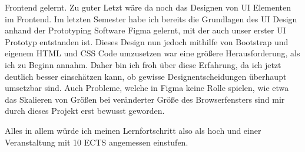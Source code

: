 Frontend gelernt. Zu guter Letzt wäre da noch das Designen von \ac{UI} Elementen im
Frontend. Im letzten Semester habe ich bereits die Grundlagen des UI Design anhand der
Prototyping Software Figma gelernt, mit der auch unser erster \ac{UI} Prototyp entstanden
ist. Dieses Design nun jedoch mithilfe von Bootstrap und eigenem HTML und CSS Code
umzusetzen war eine größere Herausforderung, als ich zu Beginn annahm. Daher bin ich froh
über diese Erfahrung, da ich jetzt deutlich besser einschätzen kann, ob gewisse
Designentscheidungen überhaupt umsetzbar sind. Auch Probleme, welche in Figma keine Rolle
spielen, wie etwa das Skalieren von Größen bei veränderter Größe des Browserfensters sind
mir durch dieses Projekt erst bewusst geworden.

Alles in allem würde ich meinen Lernfortschritt also als hoch und einer Veranstaltung mit
10 \ac{ECTS} angemessen einstufen.